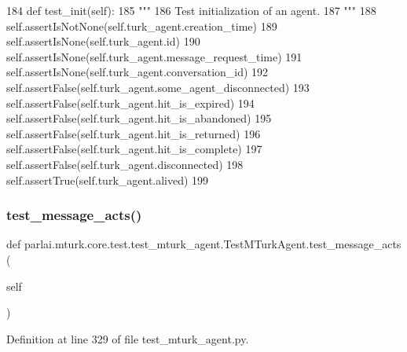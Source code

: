 \begin{DoxyCode}
184     \textcolor{keyword}{def }test\_init(self):
185         \textcolor{stringliteral}{"""}
186 \textcolor{stringliteral}{        Test initialization of an agent.}
187 \textcolor{stringliteral}{        """}
188         self.assertIsNotNone(self.turk\_agent.creation\_time)
189         self.assertIsNone(self.turk\_agent.id)
190         self.assertIsNone(self.turk\_agent.message\_request\_time)
191         self.assertIsNone(self.turk\_agent.conversation\_id)
192         self.assertFalse(self.turk\_agent.some\_agent\_disconnected)
193         self.assertFalse(self.turk\_agent.hit\_is\_expired)
194         self.assertFalse(self.turk\_agent.hit\_is\_abandoned)
195         self.assertFalse(self.turk\_agent.hit\_is\_returned)
196         self.assertFalse(self.turk\_agent.hit\_is\_complete)
197         self.assertFalse(self.turk\_agent.disconnected)
198         self.assertTrue(self.turk\_agent.alived)
199 
\end{DoxyCode}
\mbox{\label{classparlai_1_1mturk_1_1core_1_1test_1_1test__mturk__agent_1_1TestMTurkAgent_a29d9652d5946c84d31d1e2ecc0897d4d}} 
\subsubsection{\texorpdfstring{test\+\_\+message\+\_\+acts()}{test\_message\_acts()}}
{\footnotesize\ttfamily def parlai.\+mturk.\+core.\+test.\+test\+\_\+mturk\+\_\+agent.\+Test\+M\+Turk\+Agent.\+test\+\_\+message\+\_\+acts (\begin{DoxyParamCaption}\item[{}]{self }\end{DoxyParamCaption})}



Definition at line 329 of file test\+\_\+mturk\+\_\+agent.\+py.


